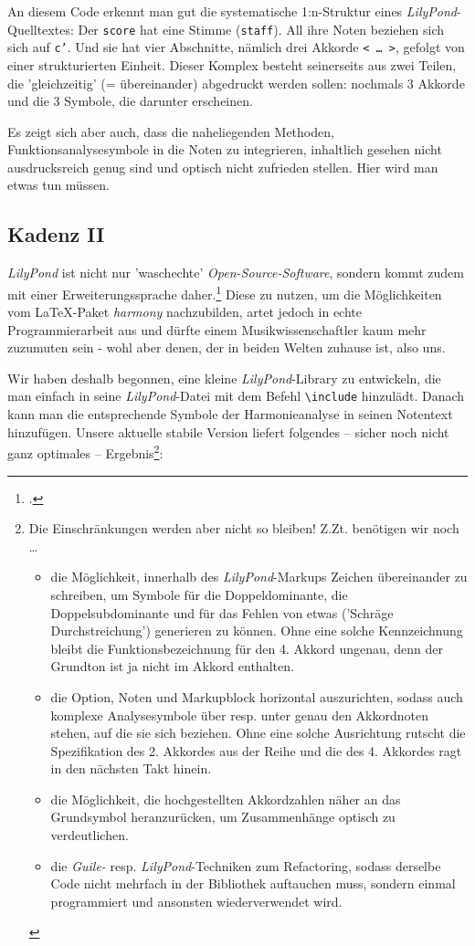 An diesem Code erkennt man gut die systematische 1:n-Struktur eines
\textit{LilyPond}-Quelltextes: Der \texttt{score} hat eine Stimme
(\texttt{staff}). All ihre Noten beziehen sich sich auf \texttt{c'}. Und sie hat
vier Abschnitte, nämlich drei Akkorde \texttt{< \ldots\ >}, gefolgt von einer
strukturierten Einheit. Dieser Komplex besteht seinerseits aus zwei Teilen, die
'gleichzeitig' (= übereinander) abgedruckt werden sollen: nochmals 3 Akkorde und
die 3 Symbole, die darunter erscheinen.

Es zeigt sich aber auch, dass die naheliegenden Methoden,
Funktionsanalysesymbole in die Noten zu integrieren, inhaltlich gesehen nicht
ausdrucksreich genug sind und optisch nicht zufrieden stellen. Hier wird man
etwas tun müssen. 

\subsection{Kadenz II}

\textit{LilyPond} ist nicht nur 'waschechte' \textit{Open-Source-Software}, sondern
kommt zudem mit einer Erweiterungssprache daher.\footcite[vgl. dazu][\nopage
wp]{WpedGuile2019a} Diese zu nutzen, um die Möglichkeiten vom \LaTeX-Paket
\textit{harmony} nachzubilden, artet jedoch in echte Programmierarbeit aus und
dürfte einem Musikwissenschaftler kaum mehr zuzumuten sein - wohl aber denen,
der in beiden Welten zuhause ist, also uns.

\label{LilyPondFuncTheory}Wir haben deshalb begonnen, eine kleine
\textit{LilyPond}-Library zu entwickeln, die man einfach in seine
\textit{LilyPond}-Datei mit dem Befehl \texttt{\textbackslash{include}}
hinzulädt. Danach kann man die entsprechende Symbole der Harmonieanalyse in
seinen Notentext hinzufügen. Unsere aktuelle stabile Version liefert folgendes
-- sicher noch nicht ganz optimales -- Ergebnis\footnote{Die Einschränkungen
werden aber nicht so bleiben! Z.Zt.
benötigen wir noch \ldots
\begin{itemize}
  \item die Möglichkeit, innerhalb des \textit{LilyPond}-Markups Zeichen
  übereinander zu schreiben, um Symbole für die Doppeldominante, die
  Doppelsubdominante und für das Fehlen von etwas ('Schräge Durchstreichung')
  generieren zu können. Ohne eine solche Kennzeichnung bleibt die
  Funktionsbezeichnung für den 4. Akkord ungenau, denn der Grundton ist ja nicht
  im Akkord enthalten.
  \item die Option, Noten und Markupblock horizontal auszurichten, sodass auch
  komplexe Analysesymbole über resp. unter genau den Akkordnoten stehen, auf die
  sie sich beziehen. Ohne eine solche Ausrichtung rutscht die Spezifikation des
  2. Akkordes aus der Reihe und die des 4. Akkordes ragt in den nächsten Takt
  hinein.
  \item die Möglichkeit, die hochgestellten Akkordzahlen näher an das
  Grundsymbol heranzurücken, um Zusammenhänge optisch zu verdeutlichen.
  \item die \textit{Guile-} resp. \textit{LilyPond}-Techniken zum Refactoring,
  sodass derselbe Code nicht mehrfach in der Bibliothek auftauchen muss, sondern
  einmal programmiert und ansonsten wiederverwendet wird.
\end{itemize}}:


